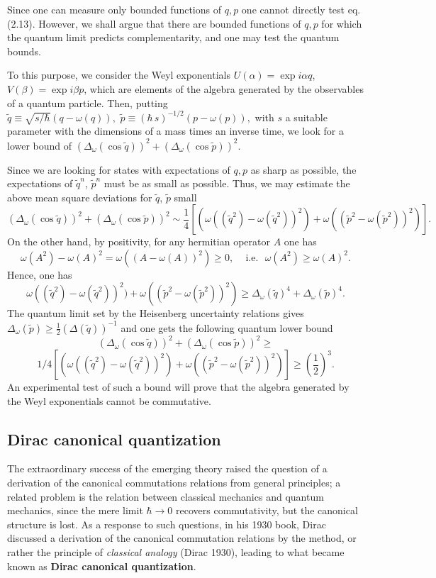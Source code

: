 \documentclass[12pt]{article}
\def \ume {{\scriptstyle{\frac{1}{2}}}}
\def \ra {\rightarrow}
\def \eqq {\equiv}
\def \a {{\alpha}}
\def \b {{\beta}}
\def \om {{\omega}}
\begin{document}
\vspace{1mm} 

Since one can measure only bounded functions of $q, p$ one cannot directly test eq.\,(2.13). 
However, we shall argue that there are  bounded functions of $q,  p$ for which the quantum limit predicts  complementarity, and  one may test the quantum bounds. 

To this purpose, we consider the Weyl exponentials $U(\a) = \exp{i \a q}$, $V(\b) = \exp{i \b p}$, which are elements of the  algebra generated by the observables of a quantum particle. Then, putting  $ \tilde{q} \eqq \sqrt{s/\hbar}(q - \om(q)), \,\,\tilde{p} \eqq (\hbar \,s)^{-1/2}(p - \om(p)),$ with $s$ a suitable parameter with the dimensions of a mass times an inverse time,  we look for a lower bound of $ (\Delta_\om(\cos \tilde{q}))^2 + (\Delta_\omega(\cos \tilde{p}))^2.$ 

\def \tilq {\tilde{q}}
\def \tilp  {\tilde{p}}

Since we are looking for states with expectations of $q, p$ as sharp as possible,  the expectations of $\tilde{q}^n$, $\tilde{p}^n$ must be as small as possible. Thus,  we may estimate  the above mean square deviations for  $\tilde{q}$, $\tilde{p}$ small  $$ (\Delta_\om(\cos \tilde{q}))^2 + (\Delta_\omega(\cos \tilde{p}))^2 \sim  {{\scriptstyle{\frac{1}{4}}}} [( \om((\tilq^2) - \om(\tilq^2))^2) + \om((\tilp^2 - \om(\tilp^2))^2)].$$
On the other hand, by positivity, for any hermitian operator $A$ one has $$\om(A^2) - \om(A)^2 = \om((A - \om(A))^2) \geq 0,\,\,\,\,\,\mbox{ i.e.}\,\,\,\, \om(A^2) \geq \om(A)^2.$$ Hence, one has $$ \om((\tilq^2) - \om(\tilq^2))^2) + \om((\tilp^2 - \om(\tilp^2))^2) \geq \Delta_\om(\tilq)^4 + \Delta_\om(\tilp)^4.$$ The quantum limit set by  the Heisenberg uncertainty relations gives $\Delta_\om(\tilp) \geq  \ume (\Delta(\tilq))^{-1}$ and one gets the following  quantum lower bound $$(\Delta_\om(\cos \tilde{q}))^2 + (\Delta_\omega(\cos \tilde{p}))^2  \geq $$ $$  1/4 [( \om((\tilq^2) - \om(\tilq^2))^2) + \om((\tilp^2 - \om(\tilp^2))^2)] \geq (\ume)^3.$$ An experimental  test of such a bound will prove that the algebra generated by the Weyl exponentials cannot be commutative.

 

 
\subsection{Dirac canonical quantization} 
The extraordinary success of the emerging theory raised  the question of   
a derivation  of the canonical commutations relations from general principles; a related problem is the relation between classical mechanics and quantum mechanics, since the mere limit $\hbar \ra 0$ recovers commutativity, but the canonical structure is lost. As a response to such questions, 
in his 1930 book, Dirac discussed  a derivation of the canonical commutation relations by the  method, or rather the principle  of {\em classical analogy} (Dirac 1930), leading to what became known as {\bf Dirac canonical quantization}.  
\end{document}
